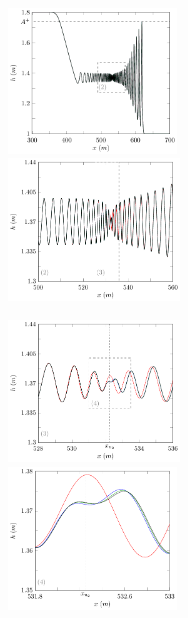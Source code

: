 \documentclass[times]{elsarticle}
\providecommand{\DIFdelend}{} %
\begin{document}
\DIFdelend %
\begin{figure}
	\centering
	\begin{subfigure}{\textwidth}
		\hspace{1mm}
		\includegraphics[width=0.49\textwidth]{Figure-17.pdf}
		\includegraphics[width=0.5\textwidth]{Figure-18.pdf}
	\end{subfigure}
	\begin{subfigure}{\textwidth}
		\includegraphics[width=0.5\textwidth]{Figure-19.pdf}
		\includegraphics[width=0.49\textwidth]{Figure-20.pdf}

\end{subfigure}
\end{figure}
\end{document}
